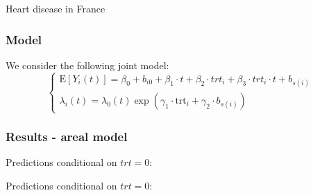 \documentclass[11pt,
compress,
]{beamer}
\begin{document}
\begin{frame}
	\huge{Heart disease in France}
\end{frame}

\begin{frame}
	\frametitle{Model}
We consider the following joint model:
\begin{equation*}
	\left\{  \begin{array}{lc}
		\textrm{E}[Y_{i}(t)]= \beta_0 + b_{i0} + \beta_1\cdot t + \beta_2\cdot trt_i + \beta_3\cdot trt_i\cdot t + b_{s(i)}\\
		\lambda_i(t)=\lambda_0(t)\exp\left(\gamma_1\cdot \textrm{trt}_i + \gamma_2\cdot b_{s(i)}\right)
	\end{array}
	\right.
\end{equation*}

\end{frame}
\begin{frame}[fragile]
	\frametitle{Results - areal model}
\end{frame}
\begin{frame}[fragile]
	Predictions conditional on $trt=0$:
	\begin{center}
	\end{center}
\end{frame}

\begin{frame}[fragile]
	Predictions conditional on $trt=0$:
		\begin{center}
		\end{center}
\end{frame}
\end{document}
